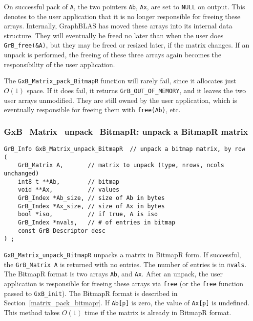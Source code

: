 \documentclass[12pt]{article}
\begin{document}
On successful pack of \verb'A', the two pointers \verb'Ab', \verb'Ax',
are set to \verb'NULL' on output.  This denotes to the user
application that it is no longer responsible for freeing these arrays.
Internally, GraphBLAS has moved these arrays into its internal data structure.
They will eventually be freed no later than when the user does
\verb'GrB_free(&A)', but they may be freed or resized later, if the matrix
changes.  If an unpack is performed, the freeing of these three arrays again
becomes the responsibility of the user application.

The \verb'GxB_Matrix_pack_BitmapR' function will rarely fail, since it allocates
just $O(1)$ space.  If it does fail, it returns \verb'GrB_OUT_OF_MEMORY',
and it leaves the two user arrays unmodified.  They are still owned by
the user application, which is eventually responsible for freeing them with
\verb'free(Ab)', etc.

\newpage
\subsubsection{{\sf GxB\_Matrix\_unpack\_BitmapR:} unpack a BitmapR matrix}
\label{matrix_unpack_bitmapr}

\begin{mdframed}[userdefinedwidth=6in]
{\footnotesize
\begin{verbatim}
GrB_Info GxB_Matrix_unpack_BitmapR  // unpack a bitmap matrix, by row
(
    GrB_Matrix A,       // matrix to unpack (type, nrows, ncols unchanged)
    int8_t **Ab,        // bitmap
    void **Ax,          // values
    GrB_Index *Ab_size, // size of Ab in bytes
    GrB_Index *Ax_size, // size of Ax in bytes
    bool *iso,          // if true, A is iso
    GrB_Index *nvals,   // # of entries in bitmap
    const GrB_Descriptor desc
) ;
\end{verbatim}
} \end{mdframed}

\verb'GxB_Matrix_unpack_BitmapR' unpacks a matrix in BitmapR form.
If successful, the \verb'GrB_Matrix A' is returned with no entries.
The number of entries is in \verb'nvals'.
The BitmapR format is two arrays \verb'Ab', and \verb'Ax'.  After an
unpack, the user application is responsible for freeing these
arrays via \verb'free' (or the \verb'free' function passed to \verb'GxB_init').
The BitmapR format is described in Section~\ref{matrix_pack_bitmapr}.
If \verb'Ab[p]' is zero, the value of \verb'Ax[p]' is undefined.
This method takes $O(1)$ time if the matrix is already in BitmapR format.
\end{document}
